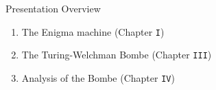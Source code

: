 \documentclass[hyphens,aspectratio=169]{beamer}
\begin{document}
\begin{frame}[fragile]{Presentation Overview}
	\begin{enumerate}
		\item The Enigma machine (Chapter \texttt{I})
		      \pause
		      \vspace{5mm}
		\item The Turing-Welchman Bombe (Chapter \texttt{III})
		      \pause
		      \vspace{5mm}

		\item Analysis of the Bombe (Chapter \texttt{IV})
	\end{enumerate}

\end{frame}








\end{document}
